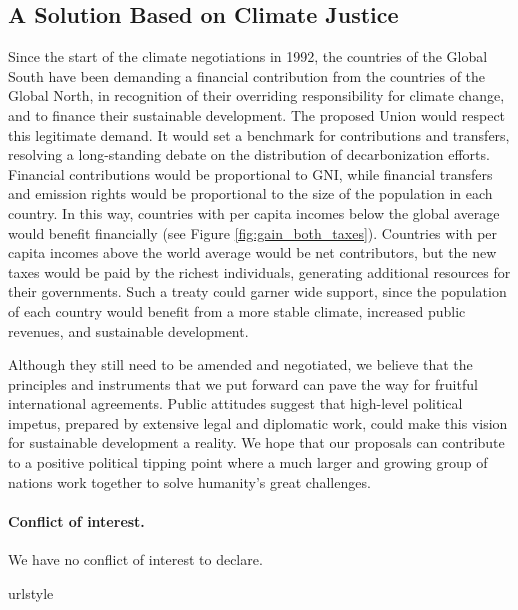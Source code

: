 \documentclass[12pt,english]{article}
\begin{document}
\begin{bibunit}
\section{A Solution Based on Climate Justice}
Since the start of the climate negotiations in 1992, the countries of the Global South have been demanding a financial contribution from the countries of the Global North, in recognition of their overriding responsibility for climate change, and to finance their sustainable development. The proposed Union would respect this legitimate demand. It would set a benchmark for contributions and transfers, resolving a long-standing debate on the distribution of decarbonization efforts. Financial contributions would be proportional to GNI, while financial transfers and emission rights would be proportional to the size of the population in each country. In this way, countries with per capita incomes below the global average would benefit financially (see Figure \ref{fig:gain_both_taxes}). Countries with per capita incomes above the world average would be net contributors, but the new taxes would be paid by the richest individuals, generating additional resources for their governments. Such a treaty could garner wide support, since the population of each country would benefit from a more stable climate, increased public revenues, and sustainable development.

Although they still need to be amended and negotiated, we believe that the principles and instruments that we put forward can pave the way for fruitful international agreements. Public attitudes suggest that high-level political impetus, prepared by extensive legal and diplomatic work, could make this vision for sustainable development a reality. We hope that our proposals can contribute to a positive political tipping point where a much larger and growing group of nations work together to solve humanity's great challenges.

\clearpage
\paragraph{Conflict of interest.} We have no conflict of interest to declare.


\renewcommand{\url}[1]{\href{#1}{Link}} %
% 
\begin{thebibliography}{9}
\providecommand{\natexlab}[1]{#1}
\providecommand{\url}[1]{\texttt{#1}}
\expandafter\ifx\csname urlstyle\endcsname\relax
  \providecommand{\doi}[1]{doi: #1}\else
  \providecommand{\doi}{doi: \begingroup \urlstyle{rm}\Url}\fi


\end{thebibliography}
\end{bibunit}
\end{document}

